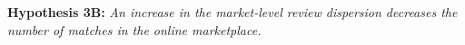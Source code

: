 \documentclass[msom,blindrev]{informs3}
\begin{document}
\noindent\textbf{Hypothesis 3B:} \emph{An increase in the market-level review dispersion decreases the number of matches in the online marketplace.}



%
%
\end{document}
